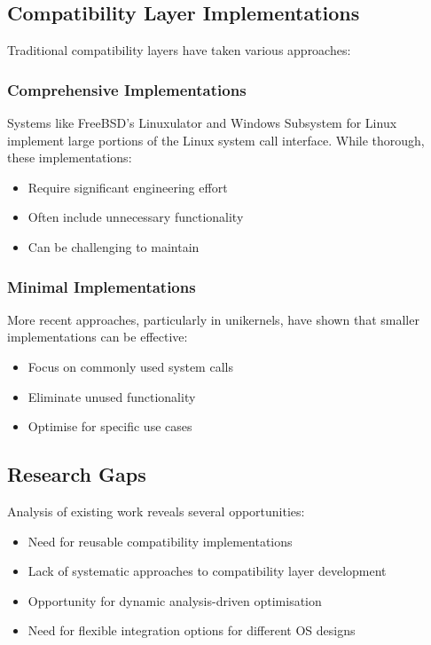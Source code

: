 \documentclass[conference]{IEEEtran}
\begin{document}
\subsection{Compatibility Layer Implementations}
Traditional compatibility layers have taken various approaches:

\subsubsection{Comprehensive Implementations}
Systems like FreeBSD's Linuxulator and Windows Subsystem for Linux implement large portions of the Linux system call interface. While thorough, these implementations:
\begin{itemize}
	\item Require significant engineering effort
	\item Often include unnecessary functionality
	\item Can be challenging to maintain
\end{itemize}

\subsubsection{Minimal Implementations}
More recent approaches, particularly in unikernels, have shown that smaller implementations can be effective:
\begin{itemize}
	\item Focus on commonly used system calls
	\item Eliminate unused functionality
	\item Optimise for specific use cases
\end{itemize}

\subsection{Research Gaps}
Analysis of existing work reveals several opportunities:
\begin{itemize}
	\item Need for reusable compatibility implementations
	\item Lack of systematic approaches to compatibility layer development
	\item Opportunity for dynamic analysis-driven optimisation
	\item Need for flexible integration options for different OS designs
\end{itemize}
\end{document}

